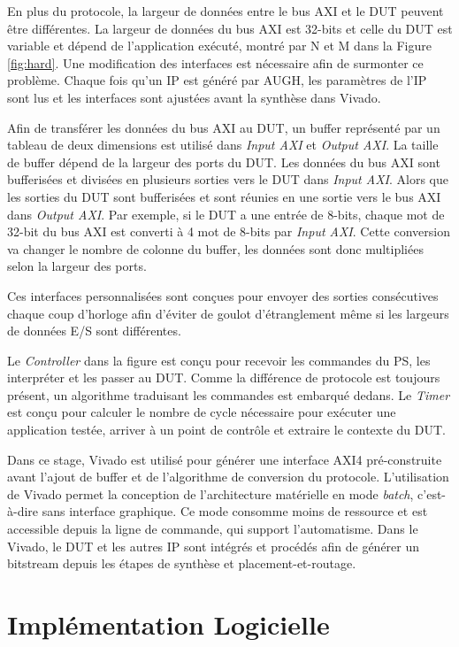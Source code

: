 En plus du protocole, la largeur de données entre le bus AXI et le DUT peuvent être différentes.
La largeur de données du bus AXI est 32-bits et celle du DUT est variable et dépend de l'application
exécuté, montré par N et M dans la Figure \ref{fig:hard}. Une modification des interfaces est nécessaire afin
de surmonter ce problème. Chaque fois qu'un IP est généré par AUGH, les paramètres de l'IP sont
lus et les interfaces sont ajustées avant la synthèse dans Vivado. 

Afin de transférer les données du bus AXI au DUT, un buffer représenté par un tableau de deux dimensions est utilisé dans
\emph{Input AXI} et \emph{Output AXI}. La taille de buffer dépend de la largeur des ports du DUT. 
Les données du bus AXI sont bufferisées et divisées en plusieurs sorties vers le DUT dans \emph{Input AXI}.
Alors que les sorties du DUT sont bufferisées et sont réunies en une sortie vers le bus AXI dans \emph{Output AXI}.
Par exemple, si le DUT a une entrée de 8-bits, chaque mot de 32-bit du bus AXI est converti à 4 mot de 8-bits par 
\emph{Input AXI}. Cette conversion va changer le nombre de colonne du buffer, les données sont donc multipliées
selon la largeur des ports.

Ces interfaces personnalisées sont conçues pour envoyer des sorties consécutives chaque coup d'horloge
afin d'éviter de goulot d'étranglement même si les largeurs de données E/S sont différentes.

Le \emph{Controller} dans la figure est conçu pour recevoir les commandes du PS, les interpréter et les passer au DUT.
Comme la différence de protocole est toujours présent, un algorithme traduisant les commandes est embarqué dedans.
Le \emph{Timer} est conçu pour calculer le nombre de cycle nécessaire pour exécuter une application testée,
arriver à un point de contrôle et extraire le contexte du DUT.

Dans ce stage, Vivado est utilisé pour générer une interface AXI4 pré-construite avant l'ajout de buffer et de l'algorithme
de conversion du protocole.
L'utilisation de Vivado permet la conception de l'architecture matérielle en mode \emph{batch}, c'est-à-dire sans interface
graphique. Ce mode consomme moins de ressource et est accessible depuis la ligne de commande, qui 
support l'automatisme. Dans le Vivado, le DUT et les autres IP sont intégrés et procédés afin de générer un bitstream
depuis les étapes de synthèse et placement-et-routage.


\section{Implémentation Logicielle}


